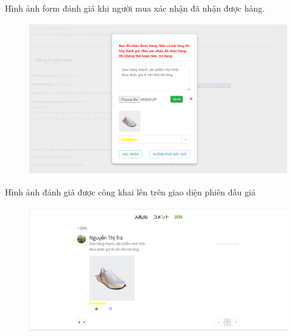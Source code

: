 \documentclass[../DoAn.tex]{subfiles}
\begin{document}
Hình ảnh form đánh giá khi người mua xác nhận đã nhận được hàng.
\begin{figure}[H]
    \centering
    \includegraphics[width=11.4cm,height=6.62cm]{Hinhve/rate.png}
\end{figure}
Hình ảnh đánh giá được công khai lên trên giao diện phiên đấu giá
\begin{figure}[H]
    \centering
    \includegraphics[width=11.4cm,height=5.46cm]{Hinhve/listrate.png}
\end{figure}
\newpage
\end{document}
